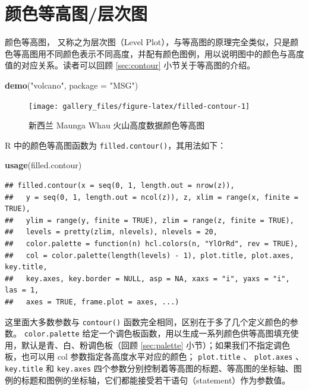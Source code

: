\documentclass[
  b5paper,
  UTF8,twoside]{book}
\newenvironment{Shaded}{\begin{snugshade}}{\end{snugshade}}
\newcommand{\AttributeTok}[1]{\textcolor[rgb]{0.13,0.29,0.53}{#1}}
\newcommand{\FunctionTok}[1]{\textcolor[rgb]{0.13,0.29,0.53}{\textbf{#1}}}
\newcommand{\NormalTok}[1]{#1}
\newcommand{\StringTok}[1]{\textcolor[rgb]{0.31,0.60,0.02}{#1}}
\begin{document}
\section{颜色等高图/层次图}\label{sec:filled-contour}

颜色等高图，\citet{Cleveland93} 又称之为层次图（Level Plot），与等高图的原理完全类似，只是颜色等高图用不同颜色表示不同高度，并配有颜色图例，用以说明图中的颜色与高度值的对应关系。读者可以回顾 \ref{sec:contour} 小节关于等高图的介绍。





\begin{Shaded}
\begin{Highlighting}[]
\FunctionTok{demo}\NormalTok{(}\StringTok{"volcano"}\NormalTok{, }\AttributeTok{package =} \StringTok{"MSG"}\NormalTok{)}
\end{Highlighting}
\end{Shaded}

\begin{figure}

{\centering \texttt{[image: gallery\_files/figure-latex/filled-contour-1]} 

}

\caption[新西兰 Maunga Whau 火山高度数据颜色等高图]{新西兰 Maunga Whau 火山高度数据颜色等高图}\label{fig:filled-contour}
\end{figure}

R 中的颜色等高图函数为 \texttt{filled.contour()}，其用法如下：

\begin{Shaded}
\begin{Highlighting}[]
\FunctionTok{usage}\NormalTok{(filled.contour)}
\end{Highlighting}
\end{Shaded}

\begin{verbatim}
## filled.contour(x = seq(0, 1, length.out = nrow(z)),
##   y = seq(0, 1, length.out = ncol(z)), z, xlim = range(x, finite = TRUE),
##   ylim = range(y, finite = TRUE), zlim = range(z, finite = TRUE),
##   levels = pretty(zlim, nlevels), nlevels = 20,
##   color.palette = function(n) hcl.colors(n, "YlOrRd", rev = TRUE),
##   col = color.palette(length(levels) - 1), plot.title, plot.axes, key.title,
##   key.axes, key.border = NULL, asp = NA, xaxs = "i", yaxs = "i", las = 1,
##   axes = TRUE, frame.plot = axes, ...)
\end{verbatim}

这里面大多数参数与 \texttt{contour()} 函数完全相同，区别在于多了几个定义颜色的参数。 \texttt{color.palette} 给定一个调色板函数，用以生成一系列颜色供等高图填充使用，默认是青、白、粉调色板（回顾 \ref{sec:palette} 小节）；如果我们不指定调色板，也可以用 col 参数指定各高度水平对应的颜色； \texttt{plot.title} 、 \texttt{plot.axes} 、 \texttt{key.title} 和 \texttt{key.axes} 四个参数分别控制着等高图的标题、等高图的坐标轴、图例的标题和图例的坐标轴，它们都能接受若干语句（statement）作为参数值。
\end{document}
